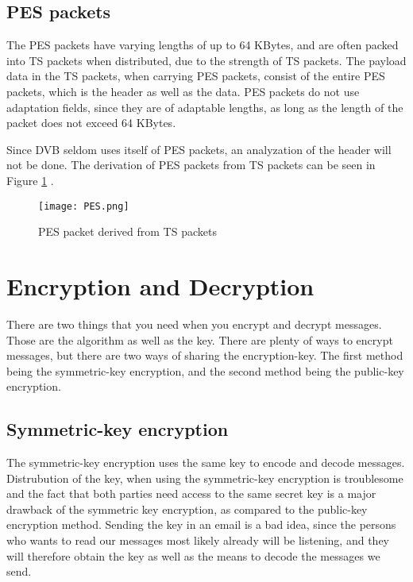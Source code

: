 \subsection{PES packets}
The PES packets have varying lengths of up to 64 KBytes, and are often packed 
into TS packets when distributed, due to the strength of TS packets. The payload 
data in the TS packets, when carrying PES packets, consist of the entire PES 
packets, which is the header as well as the data. PES packets do not use 
adaptation fields, since they are of adaptable lengths, as long as the length of 
the packet does not exceed 64 KBytes.

Since DVB seldom uses itself of PES packets, an analyzation of the header will 
not be done. The derivation of PES packets from TS packets can be seen in Figure \ref{img:PES} \citep[p. 9]{ETR:289}.


\begin{figure}
  \texttt{[image: PES.png]}
  \caption{PES packet derived from TS packets}
  \label{img:PES}
\end{figure}

\section{Encryption and Decryption}
There are two things that you need when you encrypt and decrypt messages. Those 
are the algorithm as well as the key. There are plenty of ways to encrypt 
messages, but there are two ways of sharing the encryption-key. The first method 
being the symmetric-key encryption, and the second method being the public-key 
encryption.

\subsection{Symmetric-key encryption}
The symmetric-key encryption uses the same key to encode and decode messages. 
Distrubution of the key, when using the symmetric-key encryption is troublesome 
and the fact that both parties need access to the same secret key is a major 
drawback of the symmetric key encryption, as compared to the public-key 
encryption method. Sending the key in an email is a bad idea, since the persons 
who wants to read our messages  most likely already will be listening, and they 
will therefore obtain the key as well as the means to decode the messages we 
send.

